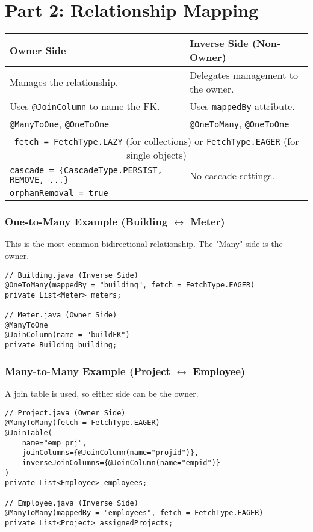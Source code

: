 \section*{Part 2: Relationship Mapping}
\begin{center}
\begin{tabular}{|l|l|}
\hline
\textbf{Owner Side} & \textbf{Inverse Side (Non-Owner)} \\
\hline
Manages the relationship. & Delegates management to the owner. \\
Uses \texttt{@JoinColumn} to name the FK. & Uses \texttt{mappedBy} attribute. \\
\hline
\texttt{@ManyToOne}, \texttt{@OneToOne} & \texttt{@OneToMany}, \texttt{@OneToOne} \\
\hline
\multicolumn{2}{|c|}{\texttt{fetch = FetchType.LAZY} (for collections) or \texttt{FetchType.EAGER} (for single objects)} \\
\hline
\texttt{cascade = \{CascadeType.PERSIST, REMOVE, ...\}} & No cascade settings. \\
\texttt{orphanRemoval = true} & \\
\hline
\end{tabular}
\end{center}

\subsubsection*{One-to-Many Example (Building $\leftrightarrow$ Meter)}
This is the most common bidirectional relationship. The "Many" side is the owner.
\begin{lstlisting}
// Building.java (Inverse Side)
@OneToMany(mappedBy = "building", fetch = FetchType.EAGER)
private List<Meter> meters;

// Meter.java (Owner Side)
@ManyToOne
@JoinColumn(name = "buildFK")
private Building building;
\end{lstlisting}

\subsubsection*{Many-to-Many Example (Project $\leftrightarrow$ Employee)}
A join table is used, so either side can be the owner.
\begin{lstlisting}
// Project.java (Owner Side)
@ManyToMany(fetch = FetchType.EAGER)
@JoinTable(
    name="emp_prj",
    joinColumns={@JoinColumn(name="projid")},
    inverseJoinColumns={@JoinColumn(name="empid")}
)
private List<Employee> employees;

// Employee.java (Inverse Side)
@ManyToMany(mappedBy = "employees", fetch = FetchType.EAGER)
private List<Project> assignedProjects;
\end{lstlisting}

